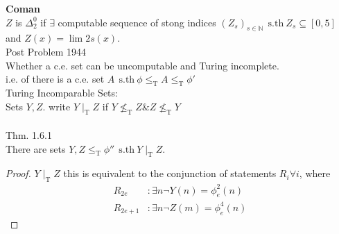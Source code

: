 \documentclass{article}
\newcommand{\sth}{\ \mathrm{s.th}\ }
\newcommand{\N}{\mathbb{N}}
\newcommand{\tr}{\leq_\mathrm{T}}
\theoremstyle{definition}
\theoremstyle{remark}
\theoremstyle{example}
\begin{document}
	\textbf{Coman}\\
	$Z$ is $\Delta_2^0$ if $\exists$ computable sequence of stong indices $(Z_s)_{s \in \N}\ \sth Z_s \subseteq [0,5]$ and $Z(x)=\lim 2s(x)$.\\
	Post Problem 1944\\
	Whether a c.e. set can be uncomputable and Turing incomplete.\\
	i.e. of there is a c.e. set $A\ \sth \phi \tr A \tr \phi'$\\
	Turing Incomparable Sets:\\
	Sets $Y,Z$. write $Y \mid_\mathrm{T}Z$ if $Y \not \tr Z \& Z \not \tr Y$\\
	\\
	Thm. 1.6.1\\
	There are sets $Y,Z \tr \phi''\ \sth Y \mid_\mathrm{T}Z$.\\
	\begin{proof}
		$Y \mid_\mathrm{T} Z$ this is equivalent to the conjunction of statements $R_i \forall i$, where \begin{align*}
			R_{2e} & :\exists n \neg Y(n)=\phi^2_e(n)\\
			R_{2e+1} & : \exists n \neg Z(m)=\phi^4_e(n)
		\end{align*}
	\end{proof} 
\end{document}
